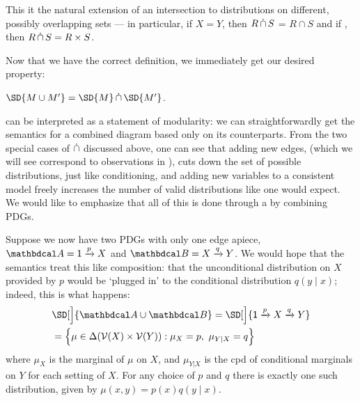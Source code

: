 \begin{vfull}
\begin{defn}[$\dcap$]
	This it the natural extension of an intersection to distributions on different, possibly overlapping sets --- in particular, if $X = Y$, then $R \operatorname{\mathop{\dot\cap}} S$ = $R \cap S$ and if , then $R \operatorname{\mathop{\dot\cap}} S = R \times S$. 
\end{defn}


Now that we have the correct definition, we immediately get our desired property:

\begin{prop}\label{prop:union-set-semantics}
	$\SD{M \cup M'} = \SD{M} \dcap \SD{M'}$.
\end{prop}

 can be interpreted as a statement of modularity: we can straightforwardly get the semantics for a combined diagram based only on its counterparts. 
From the two special cases of $\dcap$ discussed above, one can see that adding new edges, (which we will see correspond to observations in ), cuts down the set of possible distributions, just like conditioning, and adding new variables to a consistent model freely increases the number of valid distributions like one would expect. We would like to emphasize that all of this is done through a by combining PDGs.

\begin{example}\label{ex:sd-compose-unconditional}
	Suppose we now have two PDGs with only one edge apiece, $\dg A = {\var 1} \xrightarrow{p} X$ and $\dg B = X \xrightarrow{q} Y$. We would hope that the semantics treat this like composition: that the unconditional distribution on $X$ provided by $p$ would be `plugged in' to the conditional distribution $q(y \mid x)$; indeed, this is what happens:
	\begin{align*}
		&\SD[\Big]{{\dg A \cup \dg B}} = \SD[\Big]{{\var 1} \xrightarrow{p} X \xrightarrow{q} Y} \\
			&= \Big\{  \mu \in \Delta(\V(X) \times \V(Y)) : \mu_X = p,~\mu_{Y|X} = q \Big\} 
	\end{align*}
	where $\mu_X$ is the marginal of $\mu$ on $X$, and $\mu_{Y|X}$ is the cpd of conditional marginals on $Y$ for each setting of $X$.
	For any choice of $p$ and $q$ there is exactly one such distribution, given by $\mu(x,y) = p(x) q(y \mid x)$.
\end{example}



\end{vfull}
